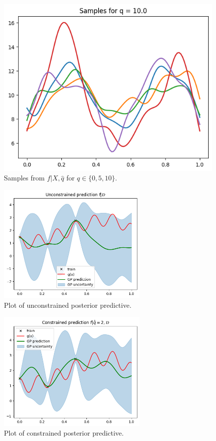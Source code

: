 \begin{figure}[p]
  \begin{subcaptionblock}{.5\textwidth}
    \centering
    \includegraphics[width=\textwidth]{./figures/gp_constr_q10.png}
  \end{subcaptionblock}
  \caption{Samples from $f | X, \hat{q}$ for $q \in \{ 0, 5, 10 \}$.}
  \label{fig:gp:constrained:samples}
\end{figure}

\begin{figure}[p]
  \centering
  \includegraphics[width=0.65\textwidth]{./figures/gp_pred_unconstrained.png}
  \caption{
    Plot of unconstrained posterior predictive.
  }
  \label{fig:gp:pred:unconstrained}
\end{figure}
%
\begin{figure}[p]
  \centering
  \includegraphics[width=0.65\textwidth]{./figures/gp_pred_constrained.png}
  \caption{
    Plot of constrained posterior predictive.
  }
  \label{fig:gp:pred:constrained}
\end{figure}
